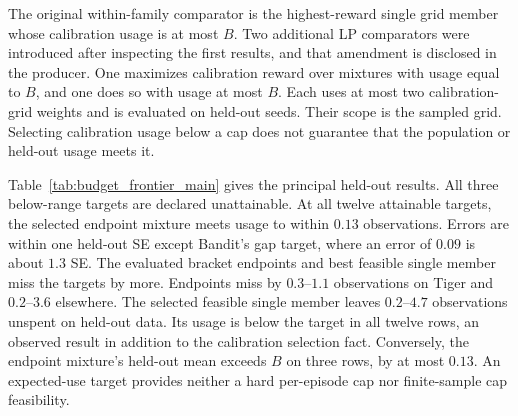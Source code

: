 \documentclass[runningheads]{llncs}
\begin{document}
The original within-family comparator is the highest-reward single grid member whose calibration usage is at most $B$. Two additional LP comparators were introduced after inspecting the first results, and that amendment is disclosed in the producer. One maximizes calibration reward over mixtures with usage equal to $B$, and one does so with usage at most $B$. Each uses at most two calibration-grid weights and is evaluated on held-out seeds. Their scope is the sampled grid. Selecting calibration usage below a cap does not guarantee that the population or held-out usage meets it.

Table~\ref{tab:budget_frontier_main} gives the principal held-out results. All three below-range targets are declared unattainable. At all twelve attainable targets, the selected endpoint mixture meets usage to within $0.13$ observations. Errors are within one held-out SE except Bandit's gap target, where an error of $0.09$ is about $1.3$ SE. The evaluated bracket endpoints and best feasible single member miss the targets by more. Endpoints miss by $0.3$--$1.1$ observations on Tiger and $0.2$--$3.6$ elsewhere. The selected feasible single member leaves $0.2$--$4.7$ observations unspent on held-out data. Its usage is below the target in all twelve rows, an observed result in addition to the calibration selection fact. Conversely, the endpoint mixture's held-out mean exceeds $B$ on three rows, by at most $0.13$. An expected-use target provides neither a hard per-episode cap nor finite-sample cap feasibility.
\end{document}
